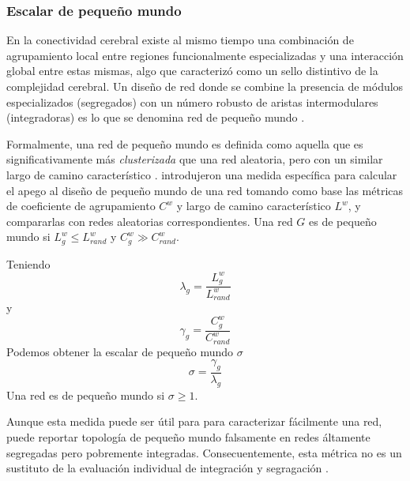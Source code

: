 \subsubsection{Escalar de pequeño mundo}
En la conectividad cerebral existe al mismo tiempo una combinación de agrupamiento local entre regiones funcionalmente especializadas y una interacción global entre estas mismas, algo que \textcite{Tononi1994} caracterizó como un sello distintivo de la complejidad cerebral.
Un diseño de red donde se combine la presencia de módulos especializados (segregados) con un número robusto de aristas intermodulares (integradoras) es lo que se denomina red de pequeño mundo \parencite{Rubinov2010}. \par
Formalmente, una red de pequeño mundo es definida como aquella que es significativamente más \textit{clusterizada} que una red aleatoria, pero con un similar largo de camino característico \parencite{Watts1998}.
\textcite{Humphries2008} introdujeron una medida específica para calcular el apego al diseño de pequeño mundo de una red tomando como base las métricas de coeficiente de agrupamiento $C^w$ y largo de camino característico $L^w$, y compararlas con redes aleatorias correspondientes. Una red $G$ es de pequeño mundo si $L_g^w \leq L_{rand}^w$ y $C_g^w \gg C_{rand}^w$. \par
Teniendo
\begin{equation}\label{eqLambda}
    \lambda_g=\frac{L_g^w}{L_{rand}^w}
\end{equation}
y
\begin{equation}\label{eqGamma}
    \gamma_g=\frac{C_g^w}{C_{rand}^w}
\end{equation}
Podemos obtener la escalar de pequeño mundo $\sigma$
\begin{equation}\label{eqSW}
    \sigma=\frac{\gamma_g}{\lambda_g}
\end{equation}
Una red es de pequeño mundo si $\sigma \geq 1$.\par
Aunque esta medida puede ser útil para para caracterizar fácilmente una red, puede reportar topología de pequeño mundo falsamente en redes áltamente segregadas pero pobremente integradas.
Consecuentemente, esta métrica no es un sustituto de la evaluación individual de integración y segragación \parencite{Rubinov2010}.


